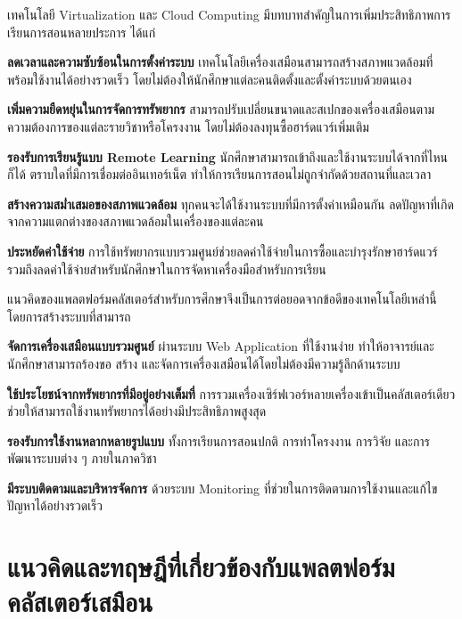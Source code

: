 \hspace*{1.3em} %
เทคโนโลยี Virtualization และ Cloud Computing มีบทบาทสำคัญในการเพิ่มประสิทธิภาพการเรียนการสอนหลายประการ ได้แก่
\begin{mycustomitem}
    \item \textbf{ลดเวลาและความซับซ้อนในการตั้งค่าระบบ} เทคโนโลยีเครื่องเสมือนสามารถสร้างสภาพแวดล้อมที่พร้อมใช้งานได้อย่างรวดเร็ว โดยไม่ต้องให้นักศึกษาแต่ละคนติดตั้งและตั้งค่าระบบด้วยตนเอง
    \item \textbf{เพิ่มความยืดหยุ่นในการจัดการทรัพยากร} สามารถปรับเปลี่ยนขนาดและสเปกของเครื่องเสมือนตามความต้องการของแต่ละรายวิชาหรือโครงงาน โดยไม่ต้องลงทุนซื้อฮาร์ดแวร์เพิ่มเติม
    \item \textbf{รองรับการเรียนรู้แบบ Remote Learning} นักศึกษาสามารถเข้าถึงและใช้งานระบบได้จากที่ไหนก็ได้ ตราบใดที่มีการเชื่อมต่ออินเทอร์เน็ต ทำให้การเรียนการสอนไม่ถูกจำกัดด้วยสถานที่และเวลา
    \item \textbf{สร้างความสม่ำเสมอของสภาพแวดล้อม} ทุกคนจะได้ใช้งานระบบที่มีการตั้งค่าเหมือนกัน ลดปัญหาที่เกิดจากความแตกต่างของสภาพแวดล้อมในเครื่องของแต่ละคน
    \item \textbf{ประหยัดค่าใช้จ่าย} การใช้ทรัพยากรแบบรวมศูนย์ช่วยลดค่าใช้จ่ายในการซื้อและบำรุงรักษาฮาร์ดแวร์ รวมถึงลดค่าใช้จ่ายสำหรับนักศึกษาในการจัดหาเครื่องมือสำหรับการเรียน
\end{mycustomitem}

\hspace*{1.3em} %
แนวคิดของแพลตฟอร์มคลัสเตอร์สำหรับการศึกษาจึงเป็นการต่อยอดจากข้อดีของเทคโนโลยีเหล่านี้ โดยการสร้างระบบที่สามารถ
\begin{mycustomitem}
    \item \textbf{จัดการเครื่องเสมือนแบบรวมศูนย์} ผ่านระบบ Web Application ที่ใช้งานง่าย ทำให้อาจารย์และนักศึกษาสามารถร้องขอ สร้าง และจัดการเครื่องเสมือนได้โดยไม่ต้องมีความรู้ลึกด้านระบบ
    \item \textbf{ใช้ประโยชน์จากทรัพยากรที่มีอยู่อย่างเต็มที่} การรวมเครื่องเซิร์ฟเวอร์หลายเครื่องเข้าเป็นคลัสเตอร์เดียว ช่วยให้สามารถใช้งานทรัพยากรได้อย่างมีประสิทธิภาพสูงสุด
    \item \textbf{รองรับการใช้งานหลากหลายรูปแบบ} ทั้งการเรียนการสอนปกติ การทำโครงงาน การวิจัย และการพัฒนาระบบต่าง ๆ ภายในภาควิชา
    \item \textbf{มีระบบติดตามและบริหารจัดการ} ด้วยระบบ Monitoring ที่ช่วยในการติดตามการใช้งานและแก้ไขปัญหาได้อย่างรวดเร็ว
\end{mycustomitem}



\section{แนวคิดและทฤษฎีที่เกี่ยวข้องกับแพลตฟอร์มคลัสเตอร์เสมือน}

